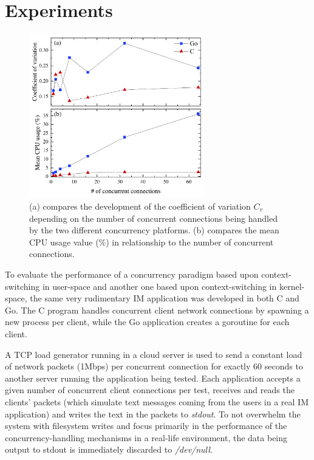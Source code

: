 \section{Experiments}
\begin{figure}[!t]
	\centering
	\includegraphics[width=3in]{img/combined_graph.pdf}
	\caption{(a) compares the development of the coefficient of variation $C_v$ depending on the number of concurrent connections being handled by the two different concurrency platforms. (b) compares the mean CPU usage value (\%) in relationship to the number of concurrent connections.}
	\label{fig_results}
\end{figure}
To evaluate the performance of a concurrency paradigm based upon context-switching in user-space and another one based upon context-switching in kernel-space, the same very rudimentary IM application was developed in both C and Go. The C program handles concurrent client network connections by spawning a new process per client, while the Go application creates a goroutine for each client. 

A TCP load generator running in a cloud server is used to send a constant load of network packets (1Mbps) per concurrent connection for exactly 60 seconds to another server running the application being tested. Each application accepts a given number of concurrent client connections per test, receives and reads the clients' packets (which simulate text messages coming from the users in a real IM application) and writes the text in the packets to \textit{stdout}. To not overwhelm the system with filesystem writes and focus primarily in the performance of the concurrency-handling mechanisms in a real-life environment, the data being output to stdout is immediately discarded to \textit{/dev/null}. 

